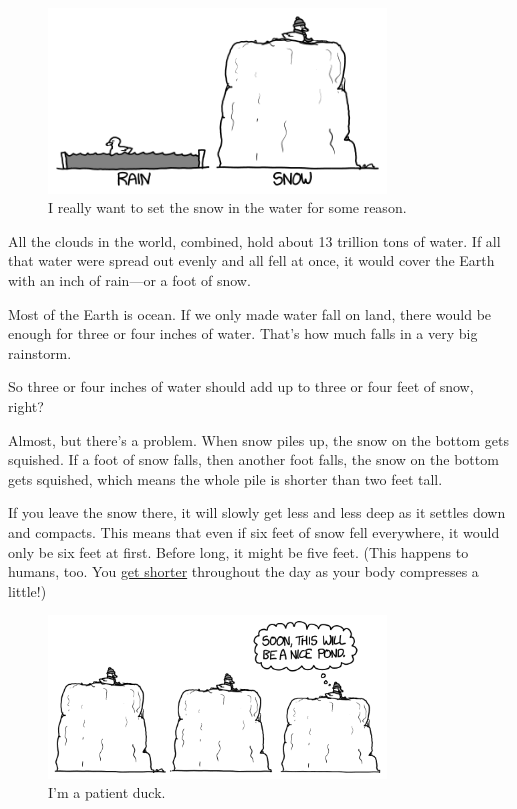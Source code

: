 {\begin{figure}[!htbp]
\centering
\includegraphics[scale=0.5, max width=0.8\textwidth]{imgs/a/104/comparison.png}
\caption{I really want to set the snow in the water for some reason.}
\end{figure}

{All the clouds in the world, combined, hold about 13 trillion tons of water. If all that water were spread out evenly and all fell at once, it would cover the Earth with an inch of rain—or a foot of snow.}

{Most of the Earth is ocean. If we only made water fall on land, there would be enough for three or four inches of water. That's how much falls in a very big rainstorm.}

{So three or four inches of water should add up to three or four feet of snow, right?}

{Almost, but there's a problem. When snow piles up, the snow on the bottom gets squished. If a foot of snow falls, then another foot falls, the snow on the bottom gets squished, which means the whole pile is shorter than two feet tall.}

{If you leave the snow there, it will slowly get less and less deep as it settles down and compacts. This means that even if six feet of snow fell everywhere, it would only be six feet at first. Before long, it might be five feet. (This happens to humans, too. You \href{http://www.ncbi.nlm.nih.gov/pmc/articles/PMC1545095/?page=1}{get shorter} throughout the day as your body compresses a little!)}

\begin{figure}[!htbp]
\centering
\includegraphics[scale=0.5, max width=0.8\textwidth]{imgs/a/104/pond.png}
\caption{I'm a patient duck.}
\end{figure}

}
